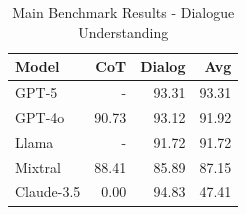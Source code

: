 \begin{table}[htbp]
\centering
\caption{Main Benchmark Results - Dialogue Understanding}
\label{tab:dialogue_main_results}
\begin{tabular}{lrrr}
\toprule
Model & CoT & Dialog & \textbf{Avg} \\
\midrule
GPT-5 & - & 93.31 & 93.31 \\
GPT-4o & 90.73 & 93.12 & 91.92 \\
Llama & - & 91.72 & 91.72 \\
Mixtral & 88.41 & 85.89 & 87.15 \\
Claude-3.5 & 0.00 & 94.83 & 47.41 \\
\bottomrule
\end{tabular}
\end{table}
